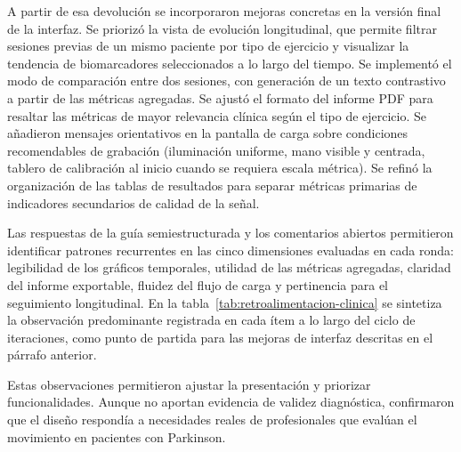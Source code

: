 A partir de esa devolución se incorporaron mejoras concretas en la versión final de la interfaz. Se priorizó la vista de evolución longitudinal, que permite filtrar sesiones previas de un mismo paciente por tipo de ejercicio y visualizar la tendencia de biomarcadores seleccionados a lo largo del tiempo. Se implementó el modo de comparación entre dos sesiones, con generación de un texto contrastivo a partir de las métricas agregadas. Se ajustó el formato del informe PDF para resaltar las métricas de mayor relevancia clínica según el tipo de ejercicio. Se añadieron mensajes orientativos en la pantalla de carga sobre condiciones recomendables de grabación (iluminación uniforme, mano visible y centrada, tablero de calibración al inicio cuando se requiera escala métrica). Se refinó la organización de las tablas de resultados para separar métricas primarias de indicadores secundarios de calidad de la señal.

Las respuestas de la guía semiestructurada y los comentarios abiertos permitieron identificar patrones recurrentes en las cinco dimensiones evaluadas en cada ronda: legibilidad de los gráficos temporales, utilidad de las métricas agregadas, claridad del informe exportable, fluidez del flujo de carga y pertinencia para el seguimiento longitudinal. En la tabla~\ref{tab:retroalimentacion-clinica} se sintetiza la observación predominante registrada en cada ítem a lo largo del ciclo de iteraciones, como punto de partida para las mejoras de interfaz descritas en el párrafo anterior.

Estas observaciones permitieron ajustar la presentación y priorizar funcionalidades. Aunque no aportan evidencia de validez diagnóstica, confirmaron que el diseño respondía a necesidades reales de profesionales que evalúan el movimiento en pacientes con Parkinson.

